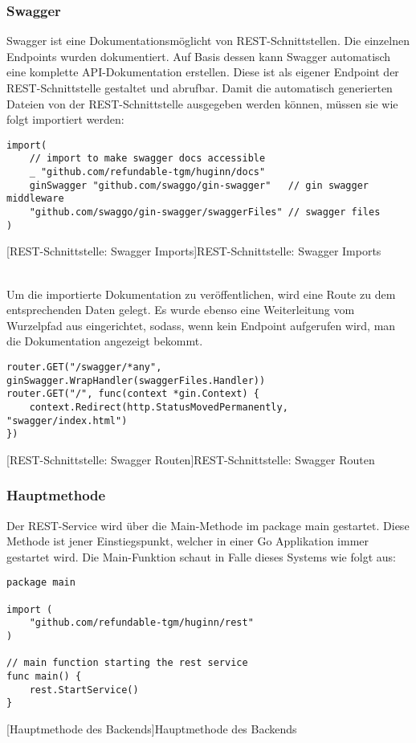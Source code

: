 \subsubsection{Swagger}

Swagger ist eine Dokumentationsmöglicht von REST-Schnittstellen. \cite{swaggo} Die einzelnen Endpoints wurden dokumentiert. Auf Basis dessen kann Swagger automatisch eine  komplette API-Dokumentation erstellen. Diese ist als eigener Endpoint der REST-Schnittstelle gestaltet und abrufbar. Damit die automatisch generierten Dateien von der REST-Schnittstelle ausgegeben werden können, müssen sie wie folgt importiert werden:

\begin{verbatim}
import(
	// import to make swagger docs accessible
	_ "github.com/refundable-tgm/huginn/docs"
	ginSwagger "github.com/swaggo/gin-swagger"   // gin swagger middleware
	"github.com/swaggo/gin-swagger/swaggerFiles" // swagger files
)
\end{verbatim}
[REST-Schnittstelle: Swagger Imports]{REST-Schnittstelle: Swagger Imports \cite{swagtut}}

~\\ Um die importierte Dokumentation zu veröffentlichen, wird eine Route zu dem entsprechenden Daten gelegt. Es wurde ebenso eine Weiterleitung vom Wurzelpfad aus eingerichtet, sodass, wenn kein Endpoint aufgerufen wird, man die Dokumentation angezeigt bekommt.

\begin{verbatim}
router.GET("/swagger/*any", ginSwagger.WrapHandler(swaggerFiles.Handler))
router.GET("/", func(context *gin.Context) {
	context.Redirect(http.StatusMovedPermanently, "swagger/index.html")
})
\end{verbatim}
[REST-Schnittstelle: Swagger Routen]{REST-Schnittstelle: Swagger Routen}

\subsubsection{Hauptmethode}

Der REST-Service wird über die Main-Methode im package main gestartet. Diese Methode ist jener Einstiegspunkt, welcher in einer Go Applikation immer gestartet wird. Die Main-Funktion schaut in Falle dieses Systems wie folgt aus:

\begin{verbatim}
package main

import (
	"github.com/refundable-tgm/huginn/rest"
)

// main function starting the rest service
func main() {
	rest.StartService()
}
\end{verbatim}
[Hauptmethode des Backends]{Hauptmethode des Backends}
